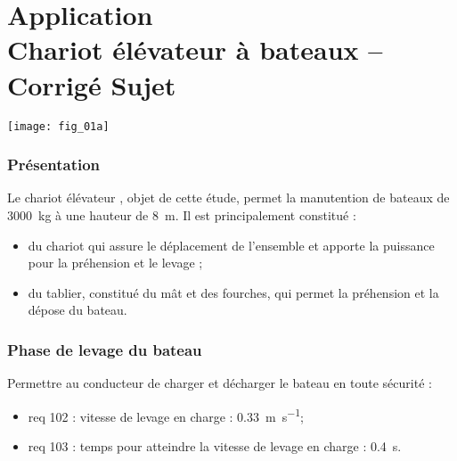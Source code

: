 \chapter*{Application  \\ 
Chariot élévateur à bateaux -- \ifprof Corrigé \else Sujet \fi}

\iflivret {} \else
\ifprof  {} \else \fi
\fi

\setcounter{question}{0}


\begin{marginfigure} [4cm]
\texttt{[image: fig\_01a]}
\end{marginfigure}

\subsection*{Présentation}
\ifprof
\else
Le chariot élévateur , objet de cette étude,  permet la manutention de bateaux de \SI{3000}{kg}
à une hauteur de \SI{8}{m}. Il est principalement constitué :
\begin{itemize}
\item du chariot qui assure le déplacement de l’ensemble et apporte la puissance pour la préhension
et le levage ;
\item du tablier, constitué du mât et des fourches, qui permet la préhension et la dépose du bateau.
\end{itemize}



\ifcolle
\else

\subsection*{Phase de levage du bateau}
\begin{obj}
Permettre au conducteur de charger et décharger le bateau en toute sécurité : 
\begin{itemize}
\item req 102 : vitesse de levage en charge : \SI{0,33}{m.s^{-1}};
\item req 103 : temps pour atteindre la vitesse de levage en charge : \SI{0,4}{s}.
\end{itemize}
\end{obj}




